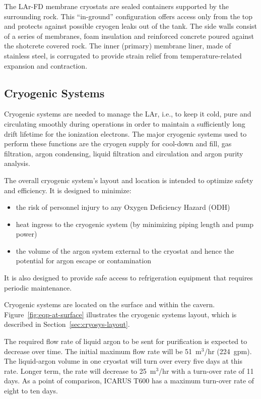 The LAr-FD membrane cryostats are sealed containers supported by the surrounding rock.  This ``in-ground'' configuration offers access only from the top and protects against possible cryogen leaks out of the tank. The side walls consist of a series of membranes, foam insulation and reinforced concrete poured against the shotcrete covered rock. The inner (primary) membrane liner, made of stainless steel, is corrugated to provide strain relief from temperature-related expansion and contraction. 


\subsection{Cryogenic Systems}
\label{sec:det_cryogenics}

Cryogenic systems are needed to manage the LAr, i.e., to keep it cold, pure and circulating smoothly during operations in order to maintain a sufficiently long drift lifetime for the ionization electrons. The major cryogenic systems used to perform these functions are the cryogen supply for cool-down and fill, gas filtration, argon condensing, liquid filtration and circulation and argon purity analysis.

The overall cryogenic system's layout and location is intended to optimize safety and efficiency. It is designed to minimize:
\begin{itemize}
\item the risk of personnel injury to any Oxygen Deficiency Hazard (ODH) 
\item heat ingress to the cryogenic system (by minimizing piping length and pump power)
\item the volume of the argon system external to the cryostat and hence the potential for argon escape or contamination
\end{itemize}
It is also designed to provide safe access to refrigeration equipment that requires periodic maintenance.

Cryogenic systems are located on the surface and within the cavern.  
Figure~\ref{fig:eqp-at-surface}  illustrates the cryogenic systems layout, which is described in 
Section~\ref{sec:cryosys-layout}.

The required flow rate of liquid argon to be sent for purification is expected to decrease over time.  The 
initial maximum flow rate will be 51~m$^3$/hr (224~gpm).  The liquid-argon volume in one cryostat will turn over every five days at this rate. 
 Longer term, the rate will decrease to 25~m$^3$/hr with a turn-over rate of 11 days.  As a point of comparison, ICARUS T600 has a maximum turn-over rate of eight to ten days.

